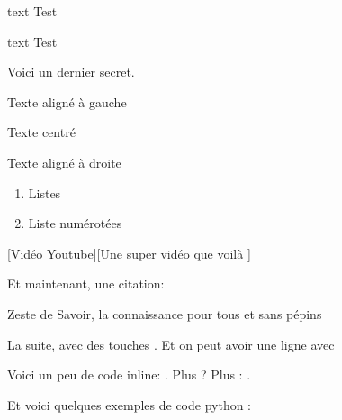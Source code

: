 \documentclass[small]{zmdocument}
\begin{document}
\begin{Spoiler}
\begin{CodeBlock}{text}
Test
\end{CodeBlock}
\end{Spoiler}

\begin{Spoiler}
\begin{CodeBlock}{text}
Test
\end{CodeBlock}
\end{Spoiler}

\begin{Spoiler}
Voici un dernier secret.
\end{Spoiler}

\begin{flushleft}
Texte aligné à gauche
\end{flushleft}

\begin{center}
Texte centré
\end{center}

\begin{flushright}
Texte aligné à droite
\end{flushright}

\begin{enumerate}
\item Listes
\item Liste numérotées
\end{enumerate}

[Vidéo Youtube][Une super vidéo que voilà ]


Et maintenant, une citation:

\begin{Quotation}[Clem]
Zeste de Savoir, la connaissance pour tous et sans pépins 
\end{Quotation}

La suite, avec des touches . Et on peut avoir une ligne avec

\horizontalLine

Voici un peu de code inline: . Plus ? Plus : .


Et voici quelques exemples de code python :
\end{document}
